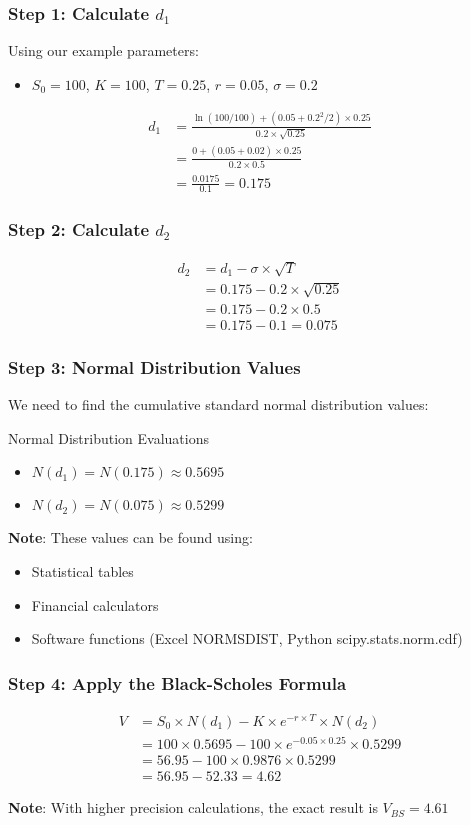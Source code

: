 \documentclass[aspectratio=169]{beamer}
\begin{document}
\begin{frame}
\frametitle{Step 1: Calculate $d_1$}
Using our example parameters:
\begin{itemize}
\item $S_0 = 100$, $K = 100$, $T = 0.25$, $r = 0.05$, $\sigma = 0.2$
\end{itemize}

\begin{align}
d_1 &= \frac{\ln(100/100) + (0.05 + 0.2^2/2) \times 0.25}{0.2 \times \sqrt{0.25}} \\
&= \frac{0 + (0.05 + 0.02) \times 0.25}{0.2 \times 0.5} \\
&= \frac{0.0175}{0.1} = 0.175
\end{align}
\end{frame}

\begin{frame}
\frametitle{Step 2: Calculate $d_2$}
\begin{align}
d_2 &= d_1 - \sigma \times \sqrt{T} \\
&= 0.175 - 0.2 \times \sqrt{0.25} \\
&= 0.175 - 0.2 \times 0.5 \\
&= 0.175 - 0.1 = 0.075
\end{align}
\end{frame}

\begin{frame}
\frametitle{Step 3: Normal Distribution Values}
We need to find the cumulative standard normal distribution values:

\begin{block}{Normal Distribution Evaluations}
\begin{itemize}
\item $N(d_1) = N(0.175) \approx 0.5695$
\item $N(d_2) = N(0.075) \approx 0.5299$
\end{itemize}
\end{block}

\textbf{Note}: These values can be found using:
\begin{itemize}
\item Statistical tables
\item Financial calculators
\item Software functions (Excel NORMSDIST, Python scipy.stats.norm.cdf)
\end{itemize}
\end{frame}

\begin{frame}
\frametitle{Step 4: Apply the Black-Scholes Formula}
\begin{align}
V &= S_0 \times N(d_1) - K \times e^{-r \times T} \times N(d_2) \\
&= 100 \times 0.5695 - 100 \times e^{-0.05 \times 0.25} \times 0.5299 \\
&= 56.95 - 100 \times 0.9876 \times 0.5299 \\
&= 56.95 - 52.33 = 4.62
\end{align}

\textbf{Note}: With higher precision calculations, the exact result is $V_{BS} = 4.61$
\end{frame}
\end{document}
